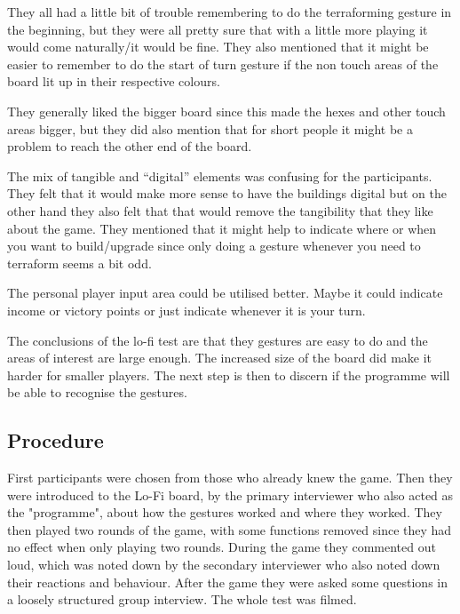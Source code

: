 They all had a little bit of trouble remembering to do the terraforming gesture in the beginning, but they were all pretty sure that with a little more playing it would come naturally/it would be fine. They also mentioned that it might be easier to remember to do the start of turn gesture if the non touch areas of the board lit up in their respective colours. 

They generally liked the bigger board since this made the hexes and other touch areas bigger, but they did also mention that for short people it might be a problem to reach the other end of the board. 

The mix of tangible and “digital” elements was confusing for the participants. They felt that it would make more sense to have the buildings digital but on the other hand they also felt that that would remove the tangibility that they like about the game. They mentioned that it might help to indicate where or when you want to build/upgrade since only doing a gesture whenever you need to terraform seems a bit odd. 

The personal player input area could be utilised better. Maybe it could indicate income or victory points or just indicate whenever it is your turn. 

The conclusions of the lo-fi test are that they gestures are easy to do and the areas of interest are large enough. The increased size of the board did make it harder for smaller players. The next step is then to discern if the programme will be able to recognise the gestures. 

\subsection{Procedure}
First participants were chosen from those who already knew the game.
Then they were introduced to the Lo-Fi board, by the primary interviewer who also acted as the "programme", about how the gestures worked and where they worked. They then played two rounds of the game, with some functions removed since they had no effect when only playing two rounds. During the game they commented out loud, which was noted down by the secondary interviewer who also noted down their reactions and behaviour. 
After the game they were asked some questions in a loosely structured group interview. 
The whole test was filmed. 